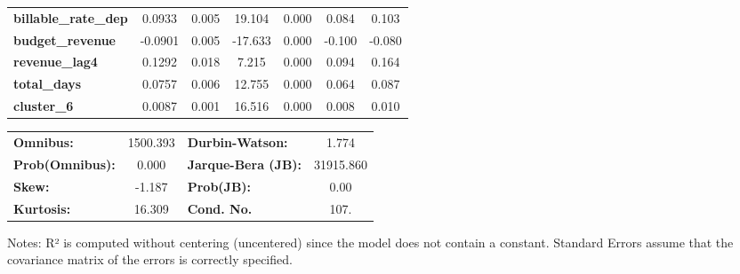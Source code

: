 \begin{center}
\begin{tabular}{lcccccc}
\textbf{billable\_rate\_dep} &       0.0933  &        0.005     &    19.104  &         0.000        &        0.084    &        0.103     \\
\textbf{budget\_revenue}     &      -0.0901  &        0.005     &   -17.633  &         0.000        &       -0.100    &       -0.080     \\
\textbf{revenue\_lag4}       &       0.1292  &        0.018     &     7.215  &         0.000        &        0.094    &        0.164     \\
\textbf{total\_days}         &       0.0757  &        0.006     &    12.755  &         0.000        &        0.064    &        0.087     \\
\textbf{cluster\_6}          &       0.0087  &        0.001     &    16.516  &         0.000        &        0.008    &        0.010     \\
\bottomrule
\end{tabular}
\begin{tabular}{lclc}
\textbf{Omnibus:}       & 1500.393 & \textbf{  Durbin-Watson:     } &     1.774  \\
\textbf{Prob(Omnibus):} &   0.000  & \textbf{  Jarque-Bera (JB):  } & 31915.860  \\
\textbf{Skew:}          &  -1.187  & \textbf{  Prob(JB):          } &      0.00  \\
\textbf{Kurtosis:}      &  16.309  & \textbf{  Cond. No.          } &      107.  \\
\bottomrule
\end{tabular}
\end{center}

Notes: \newline
 [1] R² is computed without centering (uncentered) since the model does not contain a constant. \newline
 [2] Standard Errors assume that the covariance matrix of the errors is correctly specified.